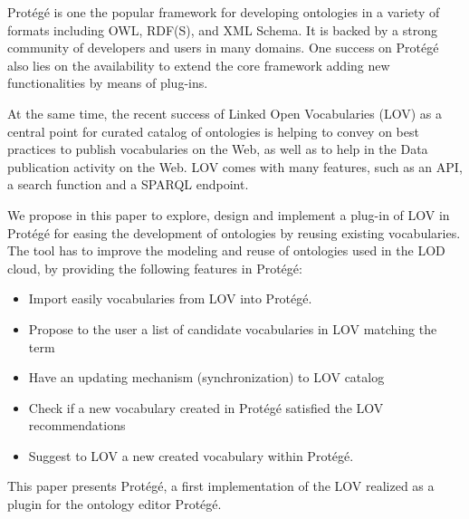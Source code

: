 Prot{\'e}g{\'e} is one the popular framework for developing ontologies in a variety of formats including OWL, RDF(S), and XML Schema. It is backed by a strong community of developers and users in many domains. One success on Prot{\'e}g{\'e} also lies on the availability to extend the core framework adding new functionalities by means of plug-ins.

At the same time, the recent success of Linked Open Vocabularies (LOV) as a central point for curated catalog of ontologies is helping to convey on best practices to publish vocabularies on the Web, as well as to help in the Data publication activity on the Web. LOV comes with many features, such as an API, a search function and a SPARQL endpoint.
 
We propose in this paper to explore, design and implement a plug-in of LOV in Prot{\'e}g{\'e} for easing the development of ontologies by reusing existing vocabularies. 
The tool has to improve the modeling and reuse of ontologies used in the LOD cloud, by providing the following features in Prot{\'e}g{\'e}:

\begin{itemize}
\item Import easily vocabularies from LOV into Prot{\'e}g{\'e}. 
\item Propose to the user a list of candidate vocabularies in LOV matching the term
\item Have an updating mechanism (synchronization) to LOV catalog
\item Check if a new vocabulary created in Prot{\'e}g{\'e} satisfied the LOV recommendations

\item Suggest to LOV a new created vocabulary within Prot{\'e}g{\'e}.
\end{itemize}

 This paper presents Prot{\'e}g{\'e}, a first implementation of the LOV realized as a plugin for the ontology editor Prot{\'e}g{\'e}. 